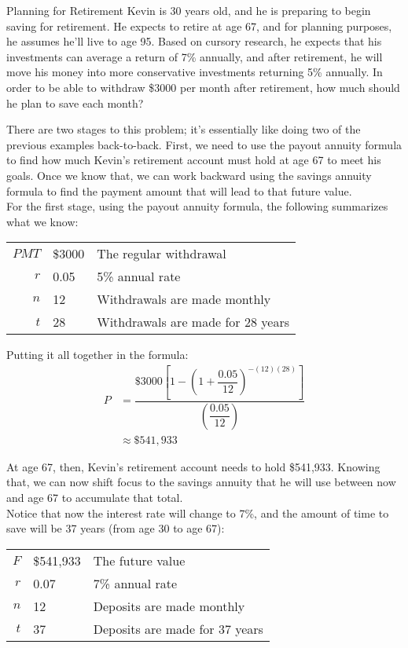 \begin{example}{Planning for Retirement}
Kevin is 30 years old, and he is preparing to begin saving for retirement.  He expects to retire at age 67, and for planning purposes, he assumes he'll live to age 95.  Based on cursory research, he expects that his investments can average a return of 7\% annually, and after retirement, he will move his money into more conservative investments returning 5\% annually.  In order to be able to withdraw \$3000 per month after retirement, how much should he plan to save each month?

\sol
There are two stages to this problem; it's essentially like doing two of the previous examples back-to-back.  First, we need to use the payout annuity formula to find how much Kevin's retirement account must hold at age 67 to meet his goals.  Once we know that, we can work backward using the savings annuity formula to find the payment amount that will lead to that future value.\\

For the first stage, using the payout annuity formula, the following summarizes what we know:
\begin{center}
\begin{tabular}{r l l}
$PMT$ & \$3000 & The regular withdrawal\\
$r$ & 0.05 & 5\% annual rate\\
$n$ & 12 & Withdrawals are made monthly\\
$t$ & 28 & Withdrawals are made for 28 years
\end{tabular}
\end{center}

Putting it all together in the formula:
\begin{align*}
P &= \dfrac{\$3000\left[1-\left(1+\dfrac{0.05}{12}\right)^{-(12)(28)}\right]}{\left(\dfrac{0.05}{12}\right)}\\
&\approx \$541,933
\end{align*}

At age 67, then, Kevin's retirement account needs to hold \$541,933.  Knowing that, we can now shift focus to the savings annuity that he will use between now and age 67 to accumulate that total.\\

Notice that now the interest rate will change to 7\%, and the amount of time to save will be 37 years (from age 30 to age 67):
\begin{center}
\begin{tabular}{r l l}
$F$ & \$541,933 & The future value\\
$r$ & 0.07 & 7\% annual rate\\
$n$ & 12 & Deposits are made monthly\\
$t$ & 37 & Deposits are made for 37 years
\end{tabular}
\end{center}


\end{example}

